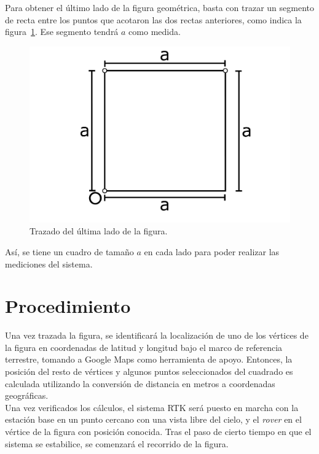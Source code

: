 Para obtener el último lado de la figura geométrica, basta con trazar un segmento de recta entre los puntos que acotaron las dos rectas anteriores, como indica la figura~\ref{fig:TrazFig10}. Ese segmento tendrá $a$ como medida.

\begin{figure}[H]
\centering
\includegraphics[scale=0.75]{Figures/Cuad10}
\caption[Trazado del último lado de la figura.]{Trazado del última lado de la figura.}
\label{fig:TrazFig10}
\end{figure}

Así, se tiene un cuadro de tamaño $a$ en cada lado para poder realizar las mediciones del sistema.

\section{Procedimiento}

Una vez trazada la figura, se identificará la localización de uno de los vértices de la figura en coordenadas de latitud y longitud bajo el marco de referencia terrestre, tomando a Google Maps como herramienta de apoyo. Entonces, la posición del resto de vértices y algunos puntos seleccionados del cuadrado es calculada utilizando la conversión de distancia en metros a coordenadas geográficas.\\

Una vez verificados los cálculos, el sistema RTK será puesto en marcha con la estación base en un punto cercano con una vista libre del cielo, y el \textit{rover} en el vértice de la figura con posición conocida. Tras el paso de cierto tiempo en que el sistema se estabilice, se comenzará el recorrido de la figura.\\

